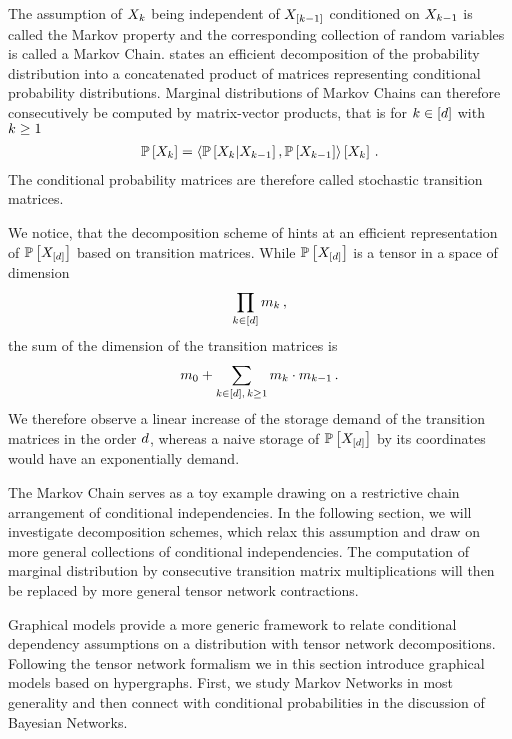 The assumption of $X_{k}$ being independent of $X_{[k-1]}$ conditioned on $X_{k-1}$ is called the Markov property and the corresponding collection of random variables is called a Markov Chain.
 states an efficient decomposition of the probability distribution into a concatenated product of matrices representing conditional probability distributions.
Marginal distributions of Markov Chains can therefore consecutively be computed by matrix-vector products, that is for $k\in[d]$ with $k\geq1$
\begin{align*}
    \mathbb{P}\left[X_{k}\right]
    = \left\langle \mathbb{P}\left[X_{k}|X_{k-1}\right],\mathbb{P}\left[X_{k-1}\right]\right\rangle \left[ X_{k} \right] \, .
\end{align*}
The conditional probability matrices are therefore called stochastic transition matrices.

We notice, that the decomposition scheme of  hints at an efficient representation of $\mathbb{P}\left[X_{[d]}\right]$ based on transition matrices.
While $\mathbb{P}\left[X_{[d]}\right]$ is a tensor in a space of dimension
\begin{align*}
    \prod_{k\in[d]} m_{k} \, ,
\end{align*}
the sum of the dimension of the transition matrices is
\begin{align*}
    m_{0} + \sum_{k\in[d],\, k\geq 1} m_{k}\cdot m_{k-1} \, .
\end{align*}
We therefore observe a linear increase of the storage demand of the transition matrices in the order $d$, whereas a naive storage of $\mathbb{P}\left[X_{[d]}\right]$ by its coordinates would have an exponentially demand.

The Markov Chain serves as a toy example drawing on a restrictive chain arrangement of conditional independencies.
In the following section, we will investigate decomposition schemes, which relax this assumption and draw on more general collections of conditional independencies.
The computation of marginal distribution by consecutive transition matrix multiplications will then be replaced by more general tensor network contractions.



Graphical models provide a more generic framework to relate conditional dependency assumptions on a distribution with tensor network decompositions.
Following the tensor network formalism we in this section introduce graphical models based on hypergraphs.
First, we study Markov Networks in most generality and then connect with conditional probabilities in the discussion of Bayesian Networks.

